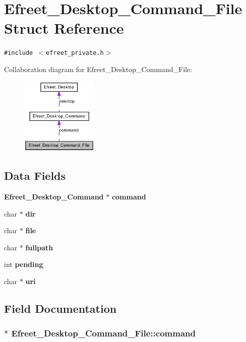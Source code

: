 \section{Efreet\_\-Desktop\_\-Command\_\-File Struct Reference}
\label{structEfreet__Desktop__Command__File}
{\tt \#include $<$efreet\_\-private.h$>$}

Collaboration diagram for Efreet\_\-Desktop\_\-Command\_\-File:\nopagebreak
\begin{figure}[H]
\begin{center}
\leavevmode
\includegraphics[width=104pt]{structEfreet__Desktop__Command__File__coll__graph}
\end{center}
\end{figure}
\subsection*{Data Fields}
\begin{CompactItemize}
\item 
{\bf Efreet\_\-Desktop\_\-Command} $\ast$ {\bf command}
\item 
char $\ast$ {\bf dir}
\item 
char $\ast$ {\bf file}
\item 
char $\ast$ {\bf fullpath}
\item 
int {\bf pending}
\item 
char $\ast$ {\bf uri}
\end{CompactItemize}


\subsection{Field Documentation}
\subsubsection[command]{$\ast$ {\bf Efreet\_\-Desktop\_\-Command\_\-File::command}}\label{structEfreet__Desktop__Command__File_4ff63f4f95696913101a58860e1b2b51}


